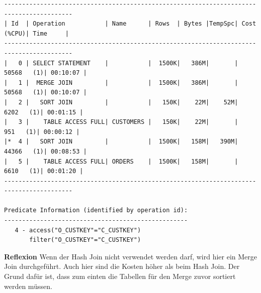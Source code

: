 \documentclass[10pt]{article}
\begin{document}
\begin{lstlisting}[style=queryexecutionplan]
-----------------------------------------------------------------------------------------
| Id  | Operation           | Name      | Rows  | Bytes |TempSpc| Cost (%CPU)| Time     |
-----------------------------------------------------------------------------------------
|   0 | SELECT STATEMENT    |           |  1500K|   386M|       | 50568   (1)| 00:10:07 |
|   1 |  MERGE JOIN         |           |  1500K|   386M|       | 50568   (1)| 00:10:07 |
|   2 |   SORT JOIN         |           |   150K|    22M|    52M|  6202   (1)| 00:01:15 |
|   3 |    TABLE ACCESS FULL| CUSTOMERS |   150K|    22M|       |   951   (1)| 00:00:12 |
|*  4 |   SORT JOIN         |           |  1500K|   158M|   390M| 44366   (1)| 00:08:53 |
|   5 |    TABLE ACCESS FULL| ORDERS    |  1500K|   158M|       |  6610   (1)| 00:01:20 |
-----------------------------------------------------------------------------------------
 
Predicate Information (identified by operation id):
---------------------------------------------------
   4 - access("O_CUSTKEY"="C_CUSTKEY")
       filter("O_CUSTKEY"="C_CUSTKEY")
\end{lstlisting}
\textbf{Reflexion} \newline
Wenn der Hash Join nicht verwendet werden darf, wird hier ein Merge Join durchgeführt.
Auch hier sind die Kosten höher als beim Hash Join.
Der Grund dafür ist, dass zum einten die Tabellen für den Merge zuvor sortiert werden müssen.
\end{document}
